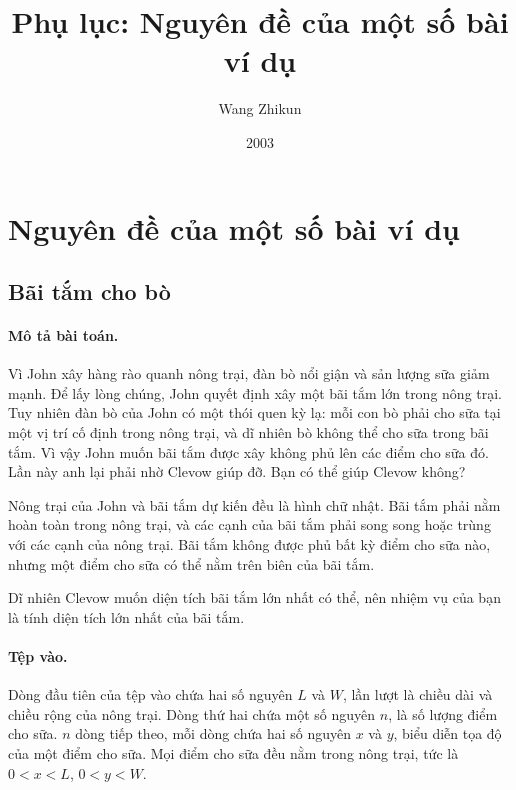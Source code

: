 \documentclass[11pt]{article}
\title{Phụ lục: Nguyên đề của một số bài ví dụ}
\author{Wang Zhikun}
\date{2003}
\begin{document}
\maketitle


\section{Nguyên đề của một số bài ví dụ}

\subsection{Bãi tắm cho bò}

\paragraph{Mô tả bài toán.}
Vì John xây hàng rào quanh nông trại, đàn bò nổi giận và sản lượng sữa giảm
mạnh. Để lấy lòng chúng, John quyết định xây một bãi tắm lớn trong nông trại.
Tuy nhiên đàn bò của John có một thói quen kỳ lạ: mỗi con bò phải cho sữa tại
một vị trí cố định trong nông trại, và dĩ nhiên bò không thể cho sữa trong bãi
tắm. Vì vậy John muốn bãi tắm được xây không phủ lên các điểm cho sữa đó. Lần
này anh lại phải nhờ Clevow giúp đỡ. Bạn có thể giúp Clevow không?

Nông trại của John và bãi tắm dự kiến đều là hình chữ nhật. Bãi tắm phải nằm
hoàn toàn trong nông trại, và các cạnh của bãi tắm phải song song hoặc trùng
với các cạnh của nông trại. Bãi tắm không được phủ bất kỳ điểm cho sữa nào,
nhưng một điểm cho sữa có thể nằm trên biên của bãi tắm.

Dĩ nhiên Clevow muốn diện tích bãi tắm lớn nhất có thể, nên nhiệm vụ của bạn
là tính diện tích lớn nhất của bãi tắm.

\paragraph{Tệp vào.}
Dòng đầu tiên của tệp vào chứa hai số nguyên \(L\) và \(W\), lần lượt là chiều
dài và chiều rộng của nông trại. Dòng thứ hai chứa một số nguyên \(n\), là số
lượng điểm cho sữa. \(n\) dòng tiếp theo, mỗi dòng chứa hai số nguyên \(x\) và
\(y\), biểu diễn tọa độ của một điểm cho sữa. Mọi điểm cho sữa đều nằm trong
nông trại, tức là \(0<x<L\), \(0<y<W\).
\end{document}

